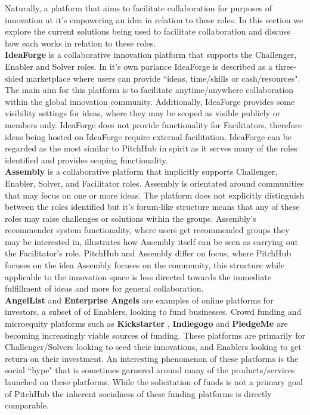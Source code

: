 Naturally, a platform that aims to facilitate collaboration for purposes of innovation at it's empowering an idea in relation to these roles. In this section we explore the current solutions being used to facilitate collaboration and discuss how each works in relation to these roles.
\\
\newline
\textbf{IdeaForge} \cite{ideaForge:online}
is a collaborative innovation platform that supports the Challenger, Enabler and Solver roles. In it's own parlance IdeaForge is described as a three-sided marketplace where users can provide ``ideas, time/skills or cash/resources". The main aim for this platform is to facilitate anytime/anywhere collaboration within the global innovation community. Additionally, IdeaForge provides some visibility settings for ideas, where they may be scoped as visible publicly or members only. IdeaForge does not provide functionality for Facilitators, therefore ideas being hosted on IdeaForge require external facilitation. IdeaForge can be regarded as the most similar to PitchHub in spirit as it serves many of the roles identified and provides scoping functionality.
\\
\newline
\textbf{Assembly} \cite{assembly:online}
is a collaborative platform that implicitly supports Challenger, Enabler, Solver, and Facilitator roles. Assembly is orientated around communities that may focus on one or more ideas. The platform does not explicitly distinguish between the roles identified but it's forum-like structure means that any of these roles may raise challenges or solutions within the groups. Assembly's recommender system functionality, where users get recommended groups they may be interested in, illustrates how Assembly itself can be seen as carrying out the Facilitator's role. PitchHub and Assembly differ on focus, where PitchHub focuses on the idea Assembly focuses on the community, this structure while applicable to the innovation space is less directed towards the immediate fulfillment of ideas and more for general collaboration.
\\
\newline
\textbf{AngelList} \cite{Angel:online} and \textbf{Enterprise Angels} \cite{enterpriseAngles:online} are examples of online platforms for investors, a subset of of Enablers, looking to fund businesses. Crowd funding and microequity platforms such as \textbf{Kickstarter} \cite{Kicks6:online}, \textbf{Indiegogo} \cite{Indie3:online} and \textbf{PledgeMe} \cite{Pledge:online} are becoming increasingly viable sources of funding. These platforms are primarily for Challenger/Solvers looking to seed their innovations, and Enablers looking to get return on their investment. An interesting phenomenon of these platforms is the social ``hype" that is sometimes garnered around many of the products/services launched on these platforms. While the solicitation of funds is not a primary goal of PitchHub the inherent socialness of these funding platforms is directly comparable.
